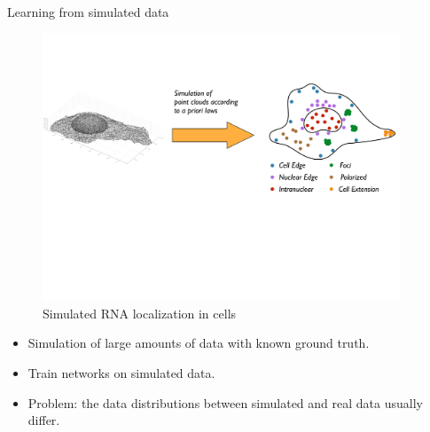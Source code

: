 \documentclass[xcolor=pdftex,dvipsnames,table]{beamer}
\begin{document}
\begin{frame}{Learning from simulated data}
\begin{figure}[htb]
   \centering
   \includegraphics[width=0.95\textwidth]{../graphics/data_simulation.pdf}
   \caption{Simulated RNA localization in cells}
\end{figure}
\begin{itemize}
   \item Simulation of large amounts of data with known ground truth. 
   \item Train networks on simulated data.
   \item Problem: the data distributions between simulated and real data usually differ. 
\end{itemize}
\end{frame}
\end{document}
